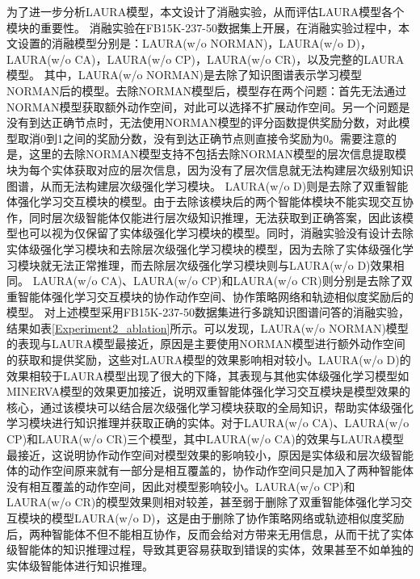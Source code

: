 \documentclass[algorithmlist, AutoFakeBold, AutoFakeSlant, figurelist, tablelist, nomlist, engineering]{seuthesix}
\begin{document}
为了进一步分析LAURA模型，本文设计了消融实验，从而评估LAURA模型各个模块的重要性。
消融实验在FB15K-237-50数据集上开展，在消融实验过程中，本文设置的消融模型分别是：LAURA(w/o NORMAN)，LAURA(w/o D)，LAURA(w/o CA)，LAURA(w/o CP)，LAURA(w/o CR)，以及完整的LAURA模型。
其中，LAURA(w/o NORMAN)是去除了知识图谱表示学习模型NORMAN后的模型。去除NORMAN模型后，模型存在两个问题：首先无法通过NORMAN模型获取额外动作空间，对此可以选择不扩展动作空间。另一个问题是没有到达正确节点时，无法使用NORMAN模型的评分函数提供奖励分数，对此模型取消0到1之间的奖励分数，没有到达正确节点则直接令奖励为0。需要注意的是，这里的去除NORMAN模型支持不包括去除NORMAN模型的层次信息提取模块为每个实体获取对应的层次信息，因为没有了层次信息就无法构建层次级别知识图谱，从而无法构建层次级强化学习模块。
LAURA(w/o D)则是去除了双重智能体强化学习交互模块的模型。由于去除该模块后的两个智能体模块不能实现交互协作，同时层次级智能体仅能进行层次级知识推理，无法获取到正确答案，因此该模型也可以视为仅保留了实体级强化学习模块的模型。同时，消融实验没有设计去除实体级强化学习模块和去除层次级强化学习模块的模型，因为去除了实体级强化学习模块就无法正常推理，而去除层次级强化学习模块则与LAURA(w/o D)效果相同。
LAURA(w/o CA)、LAURA(w/o CP)和LAURA(w/o CR)则分别是去除了双重智能体强化学习交互模块的协作动作空间、协作策略网络和轨迹相似度奖励后的模型。
对上述模型采用FB15K-237-50数据集进行多跳知识图谱问答的消融实验，结果如表\ref{Experiment2_ablation}所示。可以发现，LAURA(w/o NORMAN)模型的表现与LAURA模型最接近，原因是主要使用NORMAN模型进行额外动作空间的获取和提供奖励，这些对LAURA模型的效果影响相对较小。LAURA(w/o D)的效果相较于LAURA模型出现了很大的下降，其表现与其他实体级强化学习模型如MINERVA模型的效果更加接近，说明双重智能体强化学习交互模块是模型效果的核心，通过该模块可以结合层次级强化学习模块获取的全局知识，帮助实体级强化学习模块进行知识推理并获取正确的实体。对于LAURA(w/o CA)、LAURA(w/o CP)和LAURA(w/o CR)三个模型，其中LAURA(w/o CA)的效果与LAURA模型最接近，这说明协作动作空间对模型效果的影响较小，原因是实体级和层次级智能体的动作空间原来就有一部分是相互覆盖的，协作动作空间只是加入了两种智能体没有相互覆盖的动作空间，因此对模型影响较小。LAURA(w/o CP)和LAURA(w/o CR)的模型效果则相对较差，甚至弱于删除了双重智能体强化学习交互模块的模型LAURA(w/o D)，这是由于删除了协作策略网络或轨迹相似度奖励后，两种智能体不但不能相互协作，反而会给对方带来无用信息，从而干扰了实体级智能体的知识推理过程，导致其更容易获取到错误的实体，效果甚至不如单独的实体级智能体进行知识推理。
\end{document}
